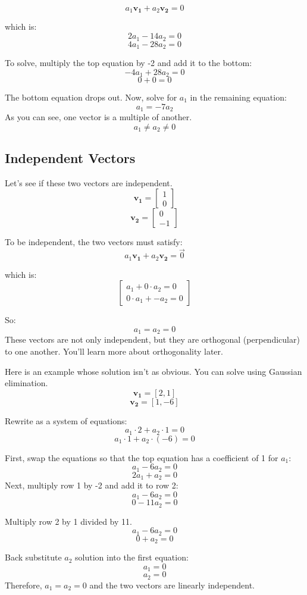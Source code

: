 	$$a_1 \mathbf{v_1} + a_2 \mathbf{v_2} = 0$$

which is:
	$$2a_1 -14a_2 = 0$$
	$$4a_1 -28a_2 = 0$$

To solve, multiply the top equation by -2 and add it to the bottom: 
$$-4a_1 + 28a_2 = 0 $$
$$ 0  + 0     = 0 $$

The bottom equation drops out. Now, solve for $a_1$ in the remaining equation:
$$a_1 = -7a_2$$
As you can see, one vector is a multiple of another. $$a_1 \neq a_2 \neq 0$$

\subsection{Independent Vectors}
Let's see if these two vectors are independent.
$$\mathbf{v_1} = \begin{bmatrix}
1 \\
0
\end{bmatrix}$$
$$\mathbf{v_2} = \begin{bmatrix}
0 \\
-1
\end{bmatrix}$$

To be independent, the two vectors must satisfy:
	$$a_1 \mathbf{v_1} + a_2 \mathbf{v_2} = \vec{0}$$
	
which is:
$$\begin{bmatrix}
	a_1 + 0\cdot a_2 = 0 \\
	0\cdot a_1 + -a_2 = 0
\end{bmatrix}$$

So:
$$a_1 = a_2 = 0$$
These vectors are not only independent, but they are orthogonal (perpendicular)
to one another. You'll learn more about orthogonality later.

Here is an example whose solution isn't as obvious. You can solve using 
Gaussian elimination.
$$\mathbf{v_1} = [2, 1]$$
$$\mathbf{v_2} = [1, -6]$$

Rewrite as a system of equations:
$$a_1\cdot 2 + a_2 \cdot 1 = 0 $$
$$a_1 \cdot 1 + a_2 \cdot (-6) = 0$$

First, swap the equations so that the top equation has a coefficient of 1 
for $a_1$:
$$a_1 - 6a_2 = 0$$ 
$$2a_1 + a_2 = 0$$ 
Next, multiply row 1 by -2 and add it to row 2:
$$a_1 - 6a_2 = 0$$ 
$$0  - 11a_2 = 0$$ 

Multiply row 2 by 1 divided by 11.
$$a_1 - 6a_2 = 0$$ 
$$0 + a_2 = 0$$ 

Back substitute $a_2$ solution into the first equation:
$$a_1  = 0$$
$$a_2 = 0$$ 
Therefore, $a_1 = a_2 = 0$ and the two vectors are linearly independent.

